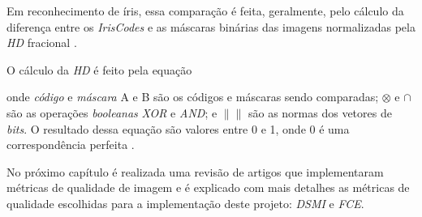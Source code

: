 \par Em reconhecimento de íris, essa comparação é feita, geralmente, pelo cálculo da diferença entre os \textit{IrisCodes} e as máscaras binárias das imagens normalizadas pela \textit{\acrfull{HD}} fracional \cite{daugman2004}.



\par O cálculo da \textit{\acrshort{HD}} é feito pela equação


\noindent onde \textit{código} e \textit{máscara} A e B são os códigos e máscaras sendo comparadas; $\otimes$ e $\cap$ são as operações \textit{booleanas} \textit{XOR} e \textit{AND}; e $\| \|$ são as normas dos vetores de \textit{bits}. O resultado dessa equação são valores entre 0 e 1, onde 0 é uma correspondência perfeita \cite{daugman2004}.



\par No próximo capítulo é realizada uma revisão de artigos que implementaram métricas de qualidade de imagem e é explicado com mais detalhes as métricas de qualidade escolhidas para a implementação deste projeto: \textit{\acrfull{DSMI}} e \textit{\acrfull{FCE}}.